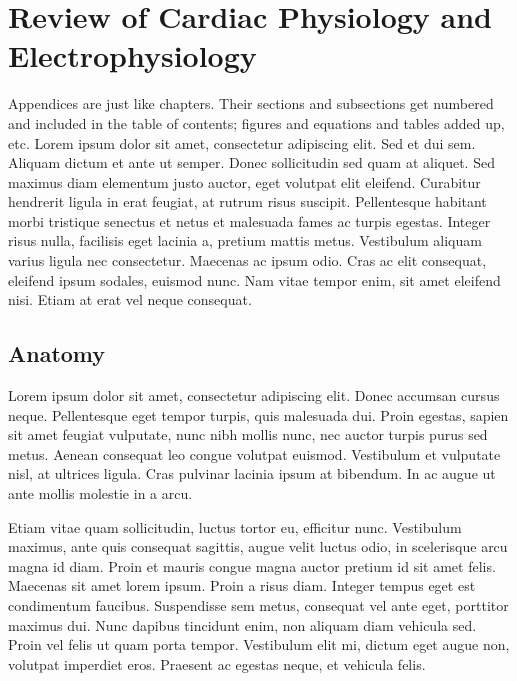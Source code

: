 
\chapter{\label{app:1-cardiophys}Review of Cardiac Physiology and Electrophysiology}

\minitoc

Appendices are just like chapters.  Their sections and subsections get numbered and included in the table of contents; figures and equations and tables added up, etc.  Lorem ipsum dolor sit amet, consectetur adipiscing elit. Sed et dui sem. Aliquam dictum et ante ut semper. Donec sollicitudin sed quam at aliquet. Sed maximus diam elementum justo auctor, eget volutpat elit eleifend. Curabitur hendrerit ligula in erat feugiat, at rutrum risus suscipit. Pellentesque habitant morbi tristique senectus et netus et malesuada fames ac turpis egestas. Integer risus nulla, facilisis eget lacinia a, pretium mattis metus. Vestibulum aliquam varius ligula nec consectetur. Maecenas ac ipsum odio. Cras ac elit consequat, eleifend ipsum sodales, euismod nunc. Nam vitae tempor enim, sit amet eleifend nisi. Etiam at erat vel neque consequat.

\section{Anatomy}
\label{sec:anatomy}

Lorem ipsum dolor sit amet, consectetur adipiscing elit. Donec accumsan cursus neque. Pellentesque eget tempor turpis, quis malesuada dui. Proin egestas, sapien sit amet feugiat vulputate, nunc nibh mollis nunc, nec auctor turpis purus sed metus. Aenean consequat leo congue volutpat euismod. Vestibulum et vulputate nisl, at ultrices ligula. Cras pulvinar lacinia ipsum at bibendum. In ac augue ut ante mollis molestie in a arcu.

Etiam vitae quam sollicitudin, luctus tortor eu, efficitur nunc. Vestibulum maximus, ante quis consequat sagittis, augue velit luctus odio, in scelerisque arcu magna id diam. Proin et mauris congue magna auctor pretium id sit amet felis. Maecenas sit amet lorem ipsum. Proin a risus diam. Integer tempus eget est condimentum faucibus. Suspendisse sem metus, consequat vel ante eget, porttitor maximus dui. Nunc dapibus tincidunt enim, non aliquam diam vehicula sed. Proin vel felis ut quam porta tempor. Vestibulum elit mi, dictum eget augue non, volutpat imperdiet eros. Praesent ac egestas neque, et vehicula felis.


